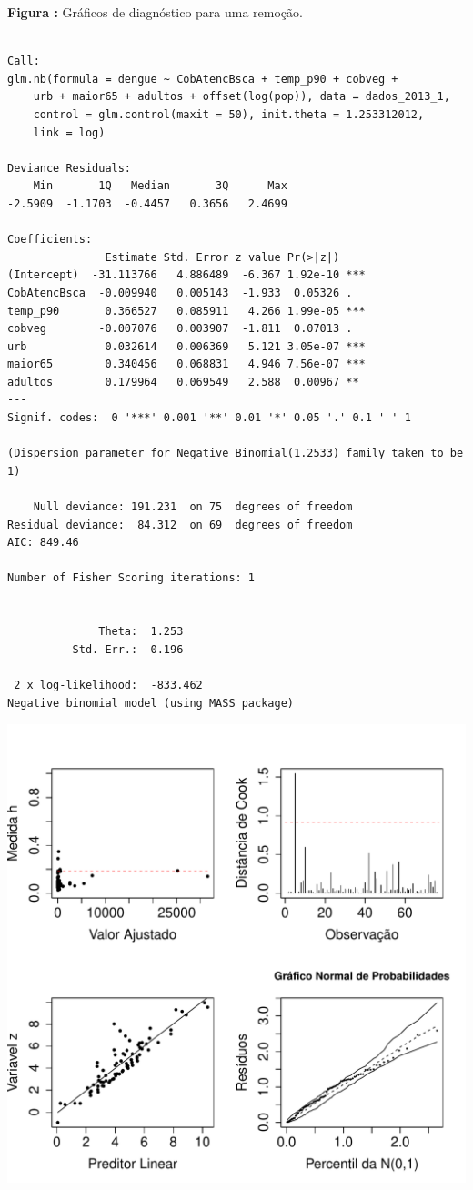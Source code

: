 \documentclass[12pt,a4paper]{article}\usepackage[]{graphicx}\usepackage[]{color}
\makeatletter
\def\maxwidth{ %
  \ifdim\Gin@nat@width>\linewidth
    \linewidth
  \else
    \Gin@nat@width
  \fi
}
\newenvironment{kframe}{%
 \def\at@end@of@kframe{}%
 \ifinner\ifhmode%
  \def\at@end@of@kframe{\end{minipage}}%
  \begin{minipage}{\columnwidth}%
 \fi\fi%
 \def\FrameCommand##1{\hskip\@totalleftmargin \hskip-\fboxsep
 \colorbox{shadecolor}{##1}\hskip-\fboxsep
     \hskip-\linewidth \hskip-\@totalleftmargin \hskip\columnwidth}%
 \MakeFramed {\advance\hsize-\width
   \@totalleftmargin\z@ \linewidth\hsize
   \@setminipage}}%
 {\par\unskip\endMakeFramed%
 \at@end@of@kframe}
\newenvironment{knitrout}{}{} %
\makeatother
\begin{document}
\textbf{Figura :} Gráficos de diagnóstico para uma remoção.




\begin{knitrout}
\color{fgcolor}\begin{kframe}
\begin{verbatim}

Call:
glm.nb(formula = dengue ~ CobAtencBsca + temp_p90 + cobveg + 
    urb + maior65 + adultos + offset(log(pop)), data = dados_2013_1, 
    control = glm.control(maxit = 50), init.theta = 1.253312012, 
    link = log)

Deviance Residuals: 
    Min       1Q   Median       3Q      Max  
-2.5909  -1.1703  -0.4457   0.3656   2.4699  

Coefficients:
               Estimate Std. Error z value Pr(>|z|)    
(Intercept)  -31.113766   4.886489  -6.367 1.92e-10 ***
CobAtencBsca  -0.009940   0.005143  -1.933  0.05326 .  
temp_p90       0.366527   0.085911   4.266 1.99e-05 ***
cobveg        -0.007076   0.003907  -1.811  0.07013 .  
urb            0.032614   0.006369   5.121 3.05e-07 ***
maior65        0.340456   0.068831   4.946 7.56e-07 ***
adultos        0.179964   0.069549   2.588  0.00967 ** 
---
Signif. codes:  0 '***' 0.001 '**' 0.01 '*' 0.05 '.' 0.1 ' ' 1

(Dispersion parameter for Negative Binomial(1.2533) family taken to be 1)

    Null deviance: 191.231  on 75  degrees of freedom
Residual deviance:  84.312  on 69  degrees of freedom
AIC: 849.46

Number of Fisher Scoring iterations: 1


              Theta:  1.253 
          Std. Err.:  0.196 

 2 x log-likelihood:  -833.462 
Negative binomial model (using MASS package) 
\end{verbatim}
\end{kframe}
\includegraphics[width=\maxwidth]{figure/unnamed-chunk-22-1} 


\end{knitrout}
\end{document}

